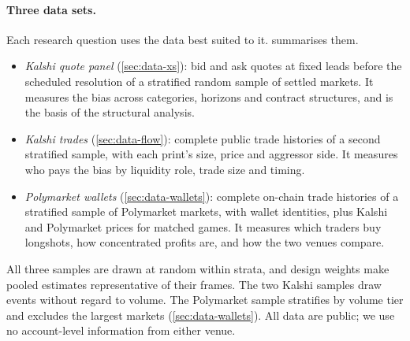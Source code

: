 \paragraph{Three data sets.} Each research question uses the data best suited to it.
 summarises them.
\begin{itemize}
  \item \emph{Kalshi quote panel} (\cref{sec:data-xs}): bid and ask quotes at fixed leads before
  the scheduled resolution of a stratified random sample of settled markets. It measures the bias
  across categories, horizons and contract structures, and is the basis of the structural
  analysis.
  \item \emph{Kalshi trades} (\cref{sec:data-flow}): complete public trade histories of a second
  stratified sample, with each print's size, price and aggressor side. It measures who pays the
  bias by liquidity role, trade size and timing.
  \item \emph{Polymarket wallets} (\cref{sec:data-wallets}): complete on-chain trade histories of a
  stratified sample of Polymarket markets, with wallet identities, plus Kalshi and Polymarket
  prices for matched games. It measures which traders buy longshots, how concentrated profits are,
  and how the two venues compare.
\end{itemize}
All three samples are drawn at random within strata, and design weights make pooled estimates
representative of their frames. The two Kalshi samples draw events without regard to volume. The
Polymarket sample stratifies by volume tier and excludes the largest markets
(\cref{sec:data-wallets}). All data are public; we use no
account-level information from either venue.


